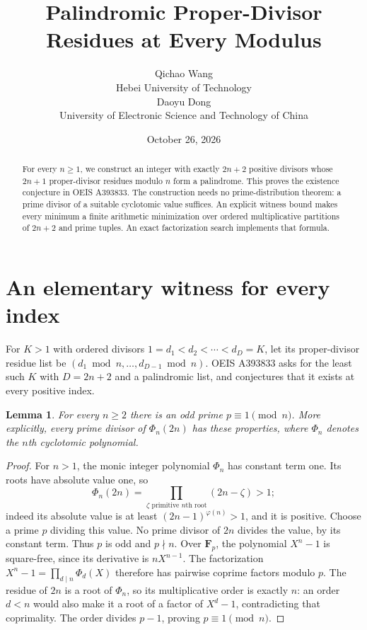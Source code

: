 \documentclass[10pt]{article}
\title{Palindromic Proper-Divisor Residues at Every Modulus}
\author{Qichao Wang\\{\small Hebei University of Technology}\\[0.3em]
Daoyu Dong\\{\small University of Electronic Science and Technology of China}}
\date{October 26, 2026}
\newtheorem{lemma}{Lemma}
\begin{document}
\maketitle
\begin{abstract}
For every $n\ge1$, we construct an integer with exactly $2n+2$
positive divisors whose $2n+1$ proper-divisor residues modulo $n$
form a palindrome. This proves the existence conjecture in OEIS
A393833. The construction needs no prime-distribution theorem:
a prime divisor of a suitable cyclotomic value suffices. An explicit
witness bound makes every minimum a finite arithmetic minimization
over ordered multiplicative partitions of $2n+2$ and prime tuples.
An exact factorization search implements that formula.
\end{abstract}

\section{An elementary witness for every index}
For $K>1$ with ordered divisors
$1=d_1<d_2<\cdots<d_D=K$, let its proper-divisor residue list be
$(d_1\bmod n,\ldots,d_{D-1}\bmod n)$. OEIS A393833 asks for the
least such $K$ with $D=2n+2$ and a palindromic list, and conjectures
that it exists at every positive index.

\begin{lemma}\label{lem:prime}
For every $n\ge2$ there is an odd prime $p\equiv1\pmod n$.
More explicitly, every prime divisor of $\Phi_n(2n)$ has these
properties, where $\Phi_n$ denotes the $n$th cyclotomic polynomial.
\end{lemma}
\begin{proof}
For $n>1$, the monic integer polynomial $\Phi_n$ has constant term
one. Its roots have absolute value one, so
\[
 \Phi_n(2n)=\prod_{\zeta\text{ primitive }n\text{th root}}(2n-\zeta)>1;
\]
indeed its absolute value is at least $(2n-1)^{\varphi(n)}>1$,
and it is positive. Choose a prime $p$ dividing this value.
No prime divisor of $2n$ divides the value, by its constant term.
Thus $p$ is odd and $p\nmid n$.
Over $\mathbf F_p$, the polynomial $X^n-1$ is square-free, since
its derivative is $nX^{n-1}$. The factorization
$X^n-1=\prod_{d\mid n}\Phi_d(X)$ therefore has pairwise coprime
factors modulo $p$. The residue of $2n$ is a root of $\Phi_n$,
so its multiplicative order is exactly $n$: an order $d<n$ would
also make it a root of a factor of $X^d-1$, contradicting that
coprimality. The order divides $p-1$, proving $p\equiv1\pmod n$.
\end{proof}
\end{document}
